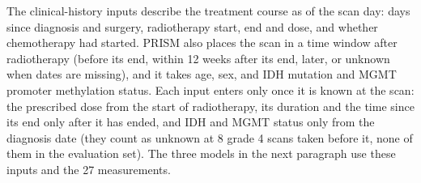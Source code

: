 The clinical-history inputs describe the treatment course as of the scan day: days since diagnosis and surgery,
radiotherapy start, end and dose, and whether chemotherapy had started. PRISM also places the scan in a time window
after radiotherapy (before its end, within 12 weeks after its end, later, or unknown when dates are missing), and it
takes age, sex, and IDH mutation and MGMT promoter methylation status. Each input enters only once it is known at the
scan: the prescribed dose from the start of radiotherapy, its duration and the time since its end only after it has
ended, and IDH and MGMT status only from the diagnosis date (they count as unknown at 8 grade 4 scans taken before
it, none of them in the evaluation set). The three models in the next paragraph use these inputs and the 27 measurements.

